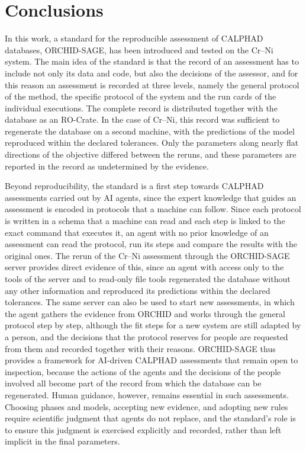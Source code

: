 \section{Conclusions}
\label{sec:conclusion}

In this work, a standard for the reproducible assessment of CALPHAD databases, ORCHID-SAGE, has been introduced and tested on the Cr--Ni system. The main idea of the standard is that the record of an assessment has to include not only its data and code, but also the decisions of the assessor, and for this reason an assessment is recorded at three levels, namely the general protocol of the method, the specific protocol of the system and the run cards of the individual executions. The complete record is distributed together with the database as an RO-Crate. In the case of Cr--Ni, this record was sufficient to regenerate the database on a second machine, with the predictions of the model reproduced within the declared tolerances. Only the parameters along nearly flat directions of the objective differed between the reruns, and these parameters are reported in the record as undetermined by the evidence.

Beyond reproducibility, the standard is a first step towards CALPHAD assessments carried out by AI agents, since the expert knowledge that guides an assessment is encoded in protocols that a machine can follow. Since each protocol is written in a schema that a machine can read and each step is linked to the exact command that executes it, an agent with no prior knowledge of an assessment can read the protocol, run its steps and compare the results with the original ones. The rerun of the Cr--Ni assessment through the ORCHID-SAGE server provides direct evidence of this, since an agent with access only to the tools of the server and to read-only file tools regenerated the database without any other information and reproduced its predictions within the declared tolerances. The same server can also be used to start new assessments, in which the agent gathers the evidence from ORCHID and works through the general protocol step by step, although the fit steps for a new system are still adapted by a person, and the decisions that the protocol reserves for people are requested from them and recorded together with their reasons. ORCHID-SAGE thus provides a framework for AI-driven CALPHAD assessments that remain open to inspection, because the actions of the agents and the decisions of the people involved all become part of the record from which the database can be regenerated. Human guidance, however, remains essential in such assessments. Choosing phases and models, accepting new evidence, and adopting new rules require scientific judgment that agents do not replace, and the standard's role is to ensure this judgment is exercised explicitly and recorded, rather than left implicit in the final parameters.

